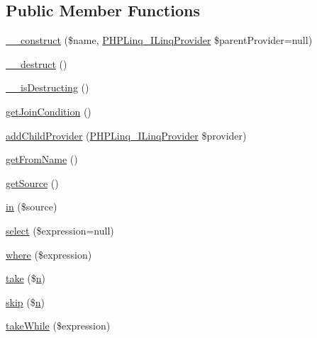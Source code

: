 \subsection*{\-Public \-Member \-Functions}
\begin{DoxyCompactItemize}
\item 
\hyperlink{class_p_h_p_linq___linq_to_zend_db_a928a5f42150b4e56d17aef568cfc5422}{\-\_\-\-\_\-construct} (\$name, \hyperlink{interface_p_h_p_linq___i_linq_provider}{\-P\-H\-P\-Linq\-\_\-\-I\-Linq\-Provider} \$parent\-Provider=null)
\item 
\hyperlink{class_p_h_p_linq___linq_to_zend_db_a421831a265621325e1fdd19aace0c758}{\-\_\-\-\_\-destruct} ()
\item 
\hyperlink{class_p_h_p_linq___linq_to_zend_db_a506479f6f7a079e71fbdeda02a1a6ab8}{\-\_\-\-\_\-is\-Destructing} ()
\item 
\hyperlink{class_p_h_p_linq___linq_to_zend_db_ad0ca423b939b19d85496cf514d1b5bb0}{get\-Join\-Condition} ()
\item 
\hyperlink{class_p_h_p_linq___linq_to_zend_db_a798e73787fcde65c17ad338b08f54fe7}{add\-Child\-Provider} (\hyperlink{interface_p_h_p_linq___i_linq_provider}{\-P\-H\-P\-Linq\-\_\-\-I\-Linq\-Provider} \$provider)
\item 
\hyperlink{class_p_h_p_linq___linq_to_zend_db_a3c49ca214406f4a6b62da5e775d6fb7a}{get\-From\-Name} ()
\item 
\hyperlink{class_p_h_p_linq___linq_to_zend_db_a42fdd8313c99d9c5f80219c1e192b93a}{get\-Source} ()
\item 
\hyperlink{class_p_h_p_linq___linq_to_zend_db_a91ece07609442e0e388f1115c21f2259}{in} (\$source)
\item 
\hyperlink{class_p_h_p_linq___linq_to_zend_db_ad65fd69a356c5d75610ef1c5c8f9e3b1}{select} (\$expression=null)
\item 
\hyperlink{class_p_h_p_linq___linq_to_zend_db_a59e1acf3496c614274a406aad5f59e99}{where} (\$expression)
\item 
\hyperlink{class_p_h_p_linq___linq_to_zend_db_a3962e38f48bc7bfd63ff01815e216ded}{take} (\$\hyperlink{add__cvs_8php_ab1b2829a7425bcec97d0ab4e6b3c77f2}{n})
\item 
\hyperlink{class_p_h_p_linq___linq_to_zend_db_af2536f10cfe7025b485561e1146e9cd0}{skip} (\$\hyperlink{add__cvs_8php_ab1b2829a7425bcec97d0ab4e6b3c77f2}{n})
\item 
\hyperlink{class_p_h_p_linq___linq_to_zend_db_a1fc5c97541d4b8666dbc7fb9ea3717a7}{take\-While} (\$expression)
\item 

\end{DoxyCompactItemize}
